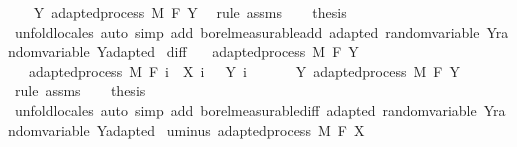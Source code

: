 \begin{isabellebody}
\ \ \isamarkupfalse%
\ Y{\isacharcolon}{\kern0pt}\ adapted{\isacharunderscore}{\kern0pt}process\ M\ F\ Y\ \isamarkupfalse%
\ {\isacharparenleft}{\kern0pt}rule\ assms{\isacharparenright}{\kern0pt}\isanewline
\ \ \isamarkupfalse%
\ {\isacharquery}{\kern0pt}thesis\ \isamarkupfalse%
\ {\isacharparenleft}{\kern0pt}unfold{\isacharunderscore}{\kern0pt}locales{\isacharparenright}{\kern0pt}\ {\isacharparenleft}{\kern0pt}auto\ simp\ add{\isacharcolon}{\kern0pt}\ borel{\isacharunderscore}{\kern0pt}measurable{\isacharunderscore}{\kern0pt}add\ adapted\ random{\isacharunderscore}{\kern0pt}variable\ Y{\isachardot}{\kern0pt}random{\isacharunderscore}{\kern0pt}variable\ Y{\isachardot}{\kern0pt}adapted{\isacharparenright}{\kern0pt}\isanewline
{}\isamarkupfalse%
%
\endisatagproof
{\isafoldproof}%
%
\isadelimproof
\isanewline
%
\endisadelimproof
\isanewline
{}\isamarkupfalse%
\ diff{\isacharcolon}{\kern0pt}\isanewline
\ \ \ {\isachardoublequoteopen}adapted{\isacharunderscore}{\kern0pt}process\ M\ F\ Y{\isachardoublequoteclose}\isanewline
\ \ \ {\isachardoublequoteopen}adapted{\isacharunderscore}{\kern0pt}process\ M\ F\ {\isacharparenleft}{\kern0pt}{\isasymlambda}i\ {\isasymxi}{\isachardot}{\kern0pt}\ X\ i\ {\isasymxi}\ {\isacharminus}{\kern0pt}\ Y\ i\ {\isasymxi}{\isacharparenright}{\kern0pt}{\isachardoublequoteclose}\isanewline
%
\isadelimproof
%
\endisadelimproof
%
\isatagproof
{}\isamarkupfalse%
\ {\isacharminus}{\kern0pt}\isanewline
\ \ \isamarkupfalse%
\ Y{\isacharcolon}{\kern0pt}\ adapted{\isacharunderscore}{\kern0pt}process\ M\ F\ Y\ \isamarkupfalse%
\ {\isacharparenleft}{\kern0pt}rule\ assms{\isacharparenright}{\kern0pt}\isanewline
\ \ \isamarkupfalse%
\ {\isacharquery}{\kern0pt}thesis\ \isamarkupfalse%
\ {\isacharparenleft}{\kern0pt}unfold{\isacharunderscore}{\kern0pt}locales{\isacharparenright}{\kern0pt}\ {\isacharparenleft}{\kern0pt}auto\ simp\ add{\isacharcolon}{\kern0pt}\ borel{\isacharunderscore}{\kern0pt}measurable{\isacharunderscore}{\kern0pt}diff\ adapted\ random{\isacharunderscore}{\kern0pt}variable\ Y{\isachardot}{\kern0pt}random{\isacharunderscore}{\kern0pt}variable\ Y{\isachardot}{\kern0pt}adapted{\isacharparenright}{\kern0pt}\isanewline
{}\isamarkupfalse%
%
\endisatagproof
{\isafoldproof}%
%
\isadelimproof
\isanewline
%
\endisadelimproof
\isanewline
{}\isamarkupfalse%
\ uminus{\isacharcolon}{\kern0pt}\ {\isachardoublequoteopen}adapted{\isacharunderscore}{\kern0pt}process\ M\ F\ {\isacharparenleft}{\kern0pt}{\isacharminus}{\kern0pt}X{\isacharparenright}{\kern0pt}{\isachardoublequoteclose}%

\end{isabellebody}

